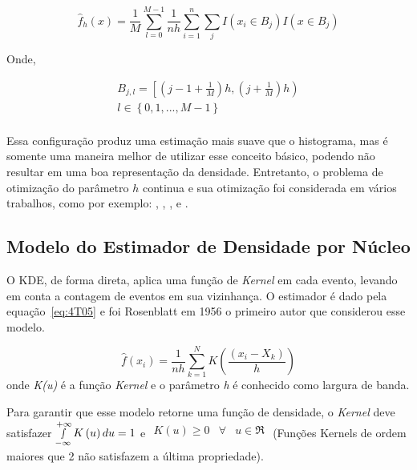 \begin{equation}\label{eq:4T03}
{\hat f_h}\left( x \right) = \frac{1}{M}\sum\limits_{l = 0}^{M - 1} {\frac{1}{{nh}}\sum\limits_{i = 1}^n {\sum\limits_j {I\left( {{x_i} \in {B_j}} \right)I\left( {x \in {B_j}} \right)} } }
\end{equation}

Onde,

\begin{equation}\label{eq:4T04}
\begin{array}{l}
 {B_{j,l}} = \left[ {\left( {j - 1 + \frac{1}{M}} \right)h,\left( {j + \frac{1}{M}} \right)h} \right) \\
 l \in \left\{ {0,1,...,M - 1} \right\} \\
 \end{array}
\end{equation}

Essa configuração produz uma estimação mais suave que o histograma, mas é somente uma maneira melhor de utilizar esse conceito básico, podendo não resultar em uma boa representação da densidade. Entretanto, o problema de otimização do parâmetro $h$ continua e sua otimização foi considerada em vários trabalhos, como por exemplo: \cite{chen2002robust}, \cite{abramson1982bandwidth}, \cite{comaniciu2001variable}, \cite{silverman1986density} e \cite{jones1991roles}.

\subsection{Modelo do Estimador de Densidade por Núcleo}

O KDE, de forma direta, aplica uma função de \emph{Kernel} em cada evento, levando em conta a contagem de eventos em sua vizinhança. O estimador é dado pela equação~\ref{eq:4T05} e foi Rosenblatt em 1956 o primeiro autor que considerou esse modelo.

\begin{equation}\label{eq:4T05}
    \hat f\left( {{x_i}} \right) = \frac{1}{{nh}}\mathop \sum \limits_{k = 1}^{N} K\left( {\frac{{({x_i} - {X_k})}}{h}} \right)
\end{equation}
onde \emph{K(u)} é a função \emph{Kernel} e o parâmetro \emph{h} é conhecido como largura de banda.

Para garantir que esse modelo retorne uma função de densidade, o \emph{Kernel} deve satisfazer $\mathop \smallint \limits_{ - \infty }^{ + \infty } K\left( u \right)du = 1$ e $\begin{array}{*{20}{c}}
   {K\left( u \right) \ge 0} & \forall  & {u \in \Re }  \\
\end{array}$ (Funções Kernels de ordem maiores que 2 não satisfazem a última propriedade).

